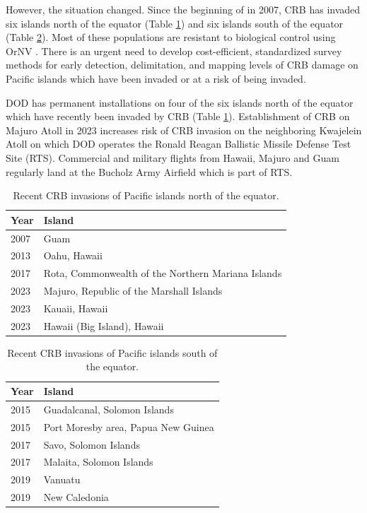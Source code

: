 \documentclass[11pt,english,letterpaper]{scrartcl}
\begin{document}
However, the situation changed. Since the beginning of in 2007, CRB has invaded six islands north of the equator (Table \ref{tbl:north}) and six islands south of the equator (Table \ref{tbl:south}). Most of these populations are resistant to biological control using OrNV \cite{Marshall2017}. There is an urgent need to develop cost-efficient, standardized survey methods for early detection, delimitation, and mapping levels of CRB damage on Pacific islands which have been invaded or at a risk of being invaded. 

DOD has permanent installations on four of the six islands north of the equator which have recently been invaded by CRB (Table \ref{tbl:north}). Establishment of CRB on Majuro Atoll in 2023 increases risk of CRB invasion on the neighboring Kwajelein Atoll on which DOD operates the Ronald Reagan Ballistic Missile Defense Test Site (RTS). Commercial and military flights from Hawaii, Majuro and Guam regularly land at the Bucholz Army Airfield which is part of RTS.

\begin{table}[H]
	\centering
	\caption{Recent CRB invasions of Pacific islands north of the equator.}	
	
	\begin{tabular}{ll}
		\toprule
		\textbf{Year} & \textbf{Island} \\ \midrule
		2007 & Guam \\			
		2013 & Oahu, Hawaii \\
		2017 & Rota, Commonwealth of the Northern Mariana Islands \\
		2023 & Majuro, Republic of the Marshall Islands \\
		2023 & Kauaii, Hawaii \\
		2023 & Hawaii (Big Island), Hawaii \\ \bottomrule		
	\end{tabular}
	\label{tbl:north}	
\end{table}

\begin{table}[H]
	\centering
	\caption{Recent CRB invasions of Pacific islands south of the equator.}	
	
	\begin{tabular}{ll}
		\toprule
		\textbf{Year} & \textbf{Island} \\ \midrule
		2015 & Guadalcanal, Solomon Islands \\
		2015 & Port Moresby area, Papua New Guinea \\
		2017 & Savo, Solomon Islands \\
		2017 & Malaita, Solomon Islands \\
		2019 & Vanuatu \\
		2019 & New Caledonia \\
	\end{tabular}
	\label{tbl:south}	
\end{table}
\end{document}
